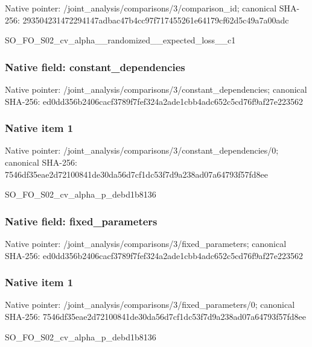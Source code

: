 \documentclass[10pt,a4paper]{article}
\begin{document}
Native pointer: /joint\_analysis/comparis\allowbreak{}ons/3/comparison\_id; canonical SHA-256: 293504231472294147adbac4\allowbreak{}7b4cc97f717455261e64179c\allowbreak{}f62d5c49a7a00adc


SO\_FO\_S02\_cv\_alpha\_\_rand\allowbreak{}omized\_\_expected\_loss\_\_c\allowbreak{}1


\subsubsection{Native field: constant\_dependencies}


Native pointer: /joint\_analysis/comparis\allowbreak{}ons/3/constant\_dependenc\allowbreak{}ies; canonical SHA-256: ed0dd356b2406cacf3789f7f\allowbreak{}ef324a2ade1cbb4adc652c5c\allowbreak{}d76f9af27e223562



\subsubsection{Native item 1}


Native pointer: /joint\_analysis/comparis\allowbreak{}ons/3/constant\_dependenc\allowbreak{}ies/0; canonical SHA-256: 7546df35eae2d72100841de3\allowbreak{}0da56d7cf1dc53f7d9a238ad\allowbreak{}07a64793f57fd8ee


SO\_FO\_S02\_cv\_alpha\_p\_debd1b8136


\subsubsection{Native field: fixed\_parameters}


Native pointer: /joint\_analysis/comparis\allowbreak{}ons/3/fixed\_parameters; canonical SHA-256: ed0dd356b2406cacf3789f7f\allowbreak{}ef324a2ade1cbb4adc652c5c\allowbreak{}d76f9af27e223562



\subsubsection{Native item 1}


Native pointer: /joint\_analysis/comparis\allowbreak{}ons/3/fixed\_parameters/0; canonical SHA-256: 7546df35eae2d72100841de3\allowbreak{}0da56d7cf1dc53f7d9a238ad\allowbreak{}07a64793f57fd8ee


SO\_FO\_S02\_cv\_alpha\_p\_debd1b8136
\end{document}
